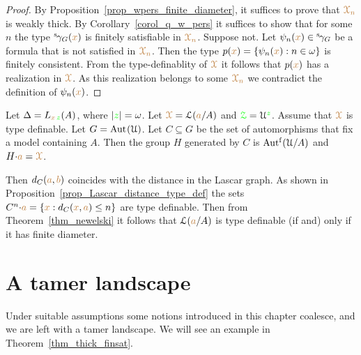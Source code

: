 \begin{proof}
  By Proposition~\ref{prop_wpers_finite_diameter}, it suffices to prove that ${\color{brown}\EuScript X_n}$ is weakly thick.
  By Corollary~\ref{corol_q_w_pers} it suffices to show that for some $n$ the type ${}^{\rm s}\kern-.2ex\gamma_G({\color{brown} x})$ is finitely satisfiable in ${\color{brown}\EuScript X_n}$.
  Suppose not.
  Let $\psi_n({\color{brown} x})\in{}^{\rm s}\kern-.2ex\gamma_G$ be a formula that is not satisfied in $\color{brown}\EuScript X_n$.
  Then the type $p({\color{brown} x})=\{\psi_n({\color{brown} x}):n\in\omega\}$ is finitely consistent.
  From the type-definablity of ${\color{brown}\EuScript X}$ it follows that $p({\color{brown} x})$ has a realization in ${\color{brown}\EuScript X}$.
  As this realization belongs to some ${\color{brown}\EuScript X_n}$ we contradict the definition of $\psi_n({\color{brown} x})$.
\end{proof}



\begin{example}\label{ex_newelski}
  Let $\Delta=L_{{\color{brown} x}\,{\color{green} z}}(A)$, where $|{\color{green} z}|=\omega$.
  Let ${\color{brown}\EuScript X}=\EuScript L({\color{brown} a}/A)$ and ${\color{green}\EuScript Z}=\EuScript U^{\color{green} z}$.
  Assume that ${\color{brown}\EuScript X}$ is type definable.
  Let $G={\rm Aut\kern.15ex}(\EuScript U)$.
  Let $C\subseteq G$ be the set of automorphisms that fix a model containing $A$.
  Then the group $H$ generated by $C$ is $\mbox{Aut$^{\rm f}$}(\EuScript U/A)$ and $H{\cdot}{\color{brown} a}={\color{brown}\EuScript X}$.
  
  Then $d_C({\color{brown} a},{\color{brown} b})$ coincides with the distance in the Lascar graph.
  As shown in Proposition~\ref{prop_Lascar_distance_type_def} the sets $C^n{\cdot}{\color{brown} a}=\{{\color{brown} x}:d_C({\color{brown} x},{\color{brown} a})\le n\}$ are type definable.
  Then from Theorem~\ref{thm_newelski} it follows that $\EuScript L({\color{brown} a}/A)$ is type definable (if and) only if it has finite diameter.
\end{example} 

\section{A tamer landscape}\label{tame_landscape}

Under suitable assumptions some notions introduced in this chapter coalesce, and we are left with a tamer landscape.
We will see an example in Theorem~\ref{thm_thick_finsat}.

